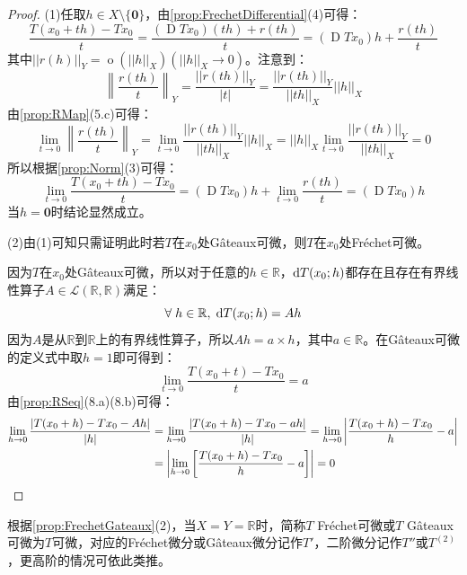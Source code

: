 \begin{proof}
	(1)任取$h\in X\setminus\{\mathbf{0}\}$，由\cref{prop:FrechetDifferential}(4)可得：
	\begin{equation*}
		\frac{T(x_0+th)-Tx_0}{t}=\frac{(\operatorname{D}Tx_0)(th)+r(th)}{t}=(\operatorname{D}Tx_0)h+\frac{r(th)}{t}
	\end{equation*}
	其中$||r(h)||_Y=\operatorname{o}(||h||_X)(||h||_X\to0)$。注意到：
	\begin{equation*}
		\left\|\frac{r(th)}{t}\right\|_Y=\frac{||r(th)||_Y}{|t|}=\frac{||r(th)||_Y}{||th||_X}||h||_X
	\end{equation*}
	由\cref{prop:RMap}(5.c)可得：
	\begin{equation*}
		\lim_{t\to0}\left\|\frac{r(th)}{t}\right\|_Y=\lim_{t\to0}\frac{||r(th)||_Y}{||th||_X}||h||_X=||h||_X\lim_{t\to0}\frac{||r(th)||_Y}{||th||_X}=0
	\end{equation*}
	所以根据\cref{prop:Norm}(3)可得：
	\begin{equation*}
		\lim_{t\to0}\frac{T(x_0+th)-Tx_0}{t}=(\operatorname{D}Tx_0)h+\lim_{t\to0}\frac{r(th)}{t}=(\operatorname{D}Tx_0)h
	\end{equation*}
	当$h=\mathbf{0}$时结论显然成立。\par
	(2)由(1)可知只需证明此时若$T$在$x_0$处G\^ateaux可微，则$T$在$x_0$处Fr\'echet可微。\par
	因为$T$在$x_0$处G\^ateaux可微，所以对于任意的$h\in\mathbb{R}$，$\mathop{}\!\mathrm{d} T(x_0;h)$都存在且存在有界线性算子$A\in\mathcal{L}(\mathbb{R},\mathbb{R})$满足：
	\begin{equation*}
		\forall\;h\in\mathbb{R},\;\mathop{}\!\mathrm{d} T(x_0;h)=Ah
	\end{equation*}
	因为$A$是从$\mathbb{R}$到$\mathbb{R}$上的有界线性算子，所以$Ah=a\times h$，其中$a\in\mathbb{R}$。在G\^ateaux可微的定义式中取$h=1$即可得到：
	\begin{equation*}
		\lim_{t\to0}\frac{T(x_0+t)-Tx_0}{t}=a
	\end{equation*}
	由\cref{prop:RSeq}(8.a)(8.b)可得：
	\begin{align*}
		\lim_{h\to0}\frac{|T(x_0+h)-Tx_0-Ah|}{|h|}&=\lim_{h\to0}\frac{|T(x_0+h)-Tx_0-ah|}{|h|}=\lim_{h\to0}\left|\frac{T(x_0+h)-Tx_0}{h}-a\right| \\
		&=\left|\lim_{h\to0}\left[\frac{T(x_0+h)-Tx_0}{h}-a\right]\right|=0\qedhere
	\end{align*}
\end{proof}
\begin{note}
	根据\cref{prop:FrechetGateaux}(2)，当$X=Y=\mathbb{R}$时，简称$T$ Fr\'echet可微或$T$ G\^ateaux可微为$T$可微，对应的Fr\'echet微分或G\^ateaux微分记作$T'$，二阶微分记作$T''$或$T^{(2)}$，更高阶的情况可依此类推。
\end{note}
